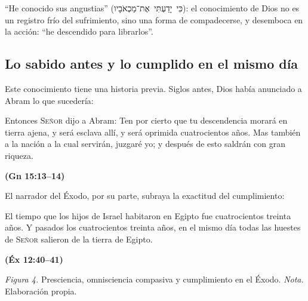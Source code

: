 \documentclass[11pt,letterpaper]{article}
\newcommand{\heb}[1]{\mbox{\foreignlanguage{hebrew}{#1}}}
\newcommand{\SENOR}{\textsc{Señor}}
\newcommand{\fuente}[1]{\par\hfill{\upshape\bfseries\small\textcolor{azul}{#1}}}
\begin{document}
``He conocido sus angustias'' (\heb{כִּי יָדַעְתִּי אֶת־מַכְאֹבָיו}): el conocimiento de Dios no es un registro frío del sufrimiento, sino una forma de compadecerse, y desemboca en la acción: ``he descendido para librarlos''.

\subsection{Lo sabido antes y lo cumplido en el mismo día}
Este conocimiento tiene una historia previa. Siglos antes, Dios había anunciado a Abram lo que sucedería:

\begin{cita}Entonces \SENOR{} dijo a Abram: Ten por cierto que tu descendencia morará en tierra ajena, y será esclava allí, y será oprimida cuatrocientos años. Mas también a la nación a la cual servirán, juzgaré yo; y después de esto saldrán con gran riqueza.\fuente{(Gn 15:13--14)}\end{cita}

El narrador del Éxodo, por su parte, subraya la exactitud del cumplimiento:

\begin{cita}El tiempo que los hijos de Israel habitaron en Egipto fue cuatrocientos treinta años. Y pasados los cuatrocientos treinta años, en el mismo día todas las huestes de \SENOR{} salieron de la tierra de Egipto.\fuente{(Éx 12:40--41)}\end{cita}

\begin{center}
\par
{\footnotesize\color{gris}\textit{Figura 4.} Presciencia, omnisciencia compasiva y cumplimiento en el Éxodo. \textit{Nota.} Elaboración propia.}
\end{center}
\end{document}
